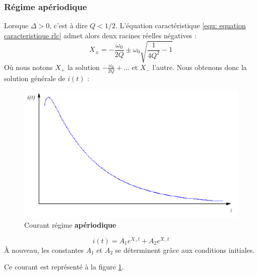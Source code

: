 \documentclass[12pt,a4paper]{article}
\begin{document}
\subsubsection[Cas 3 : Régime apériodique]{Régime apériodique}
Lorsque $\Delta > 0$, c'est à dire $Q < 1/2$. L'équation caractéristique \ref{equ: equation caracteristique rlc} admet alors deux racines réelles négatives :
\begin{equation}
	X_\pm = -\frac{\omega_0}{2Q} \pm \omega_0\sqrt{\frac{1}{4Q^2}-1}
\end{equation}
Où nous notons $X_+$ la solution $-\frac{\omega_0}{2Q} + ...$ et $X_-$ l'autre. Nous obtenons donc la solution générale de $i(t)$ :
\begin{figure}
	\centering
	\includegraphics[scale=0.5]{images/regime_aperiodique}
	\caption{Courant régime \textbf{apériodique}}
	\label{fig: regime aperiodique}
\end{figure}
\begin{boite}
	\begin{equation}
		i(t) = A_1e^{X_+ t} + A_2e^{X_- t}
	\end{equation}
	À nouveau, les constantes $A_1$ et $A_2$ se déterminent grâce aux conditions initiales.
\end{boite}
Ce courant est représenté à la figure \ref{fig: regime aperiodique}.




\newpage
\end{document}
